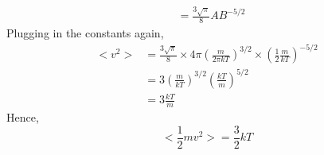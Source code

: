 \documentclass{article}
\begin{document}
\begin{itemize}
\begin{align*}
	&= \frac{3\sqrt{\pi}}{8}AB^{-5/2}
	\end{align*}
	Plugging in the constants again,
	\begin{align*}
	<v^2> &= \frac{3\sqrt{\pi}}{8}\times 4\pi\left(\frac{m}{2\pi kT}\right)^{3/2}\times \left(\frac{1}{2}\frac{m}{kT}\right)^{-5/2} \\
	&= 3\left(\frac{m}{kT}\right)^{3/2}\left(\frac{kT}{m}\right)^{5/2} \\
	&= 3\frac{kT}{m}
	\end{align*}
	Hence,
	\begin{equation}
	<\frac{1}{2}mv^2> = \frac{3}{2}kT
	\end{equation}
\end{itemize}
\end{document}
